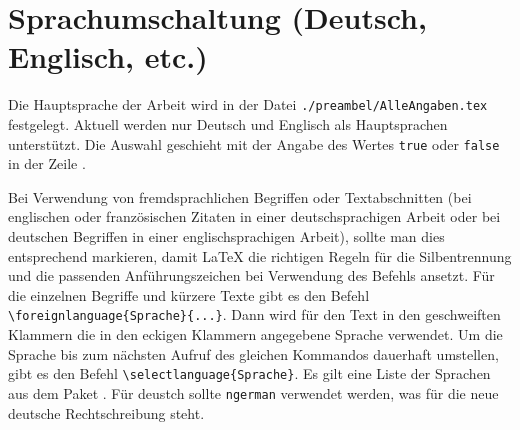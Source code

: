 \section{Sprachumschaltung (Deutsch, Englisch, etc.)}%
%
%
%
\label{sec:Sprache}
%
Die Hauptsprache der Arbeit wird in der Datei \texttt{./preambel/AlleAngaben.tex} festgelegt.
Aktuell werden nur Deutsch und Englisch als Hauptsprachen unterstützt.
Die Auswahl geschieht mit der Angabe des Wertes \texttt{true} oder \texttt{false}
in der Zeile .

Bei Verwendung von fremdsprachlichen Begriffen oder Textabschnitten
(\zB bei englischen oder französischen Zitaten in einer deutschsprachigen Arbeit
oder bei deutschen Begriffen in einer englischsprachigen Arbeit),
sollte man dies entsprechend markieren,
damit \LaTeX{} die richtigen Regeln für die Silbentrennung
und die passenden Anführungszeichen bei Verwendung des Befehls
 ansetzt.
Für die einzelnen Begriffe und kürzere Texte gibt es den Befehl
\verb+\foreignlanguage{Sprache}{...}+.
Dann wird für den Text in den geschweiften Klammern die in den eckigen Klammern angegebene Sprache verwendet.
Um die Sprache bis zum nächsten Aufruf des gleichen Kommandos dauerhaft umstellen,
gibt es den Befehl \verb+\selectlanguage{Sprache}+.
Es gilt eine Liste der Sprachen aus dem Paket .
Für deustch sollte \texttt{ngerman} verwendet werden, was für die
neue deutsche Rechtschreibung steht.